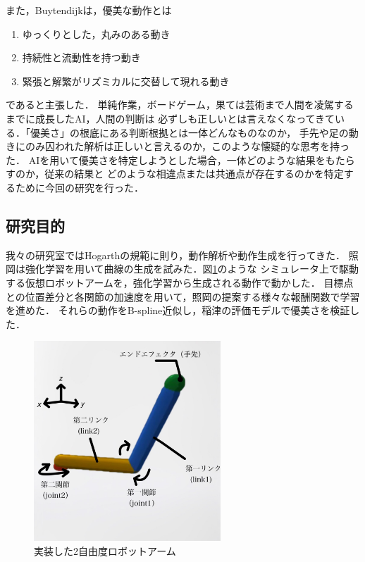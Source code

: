\clearpage

また，Buytendijkは，優美な動作とは
\begin{enumerate}
  \item ゆっくりとした，丸みのある動き
  \item 持続性と流動性を持つ動き
  \item 緊張と解繁がリズミカルに交替して現れる動き
\end{enumerate}
であると主張した．
単純作業，ボードゲーム，果ては芸術まで人間を凌駕するまでに成長したAI，人間の判断は
必ずしも正しいとは言えなくなってきている．「優美さ」の根底にある判断根拠とは一体どんなものなのか，
手先や足の動きにのみ囚われた解析は正しいと言えるのか，このような懐疑的な思考を持った．
AIを用いて優美さを特定しようとした場合，一体どのような結果をもたらすのか，従来の結果と
どのような相違点または共通点が存在するのかを特定するために今回の研究を行った．

\subsection{研究目的}
我々の研究室ではHogarthの規範に則り，動作解析や動作生成を行ってきた．
照岡\cite{teruoka}は強化学習を用いて曲線の生成を試みた．図\ref{robot_arm}のような
シミュレータ上で駆動する仮想ロボットアームを，強化学習から生成される動作で動かした．
目標点との位置差分と各関節の加速度を用いて，照岡の提案する様々な報酬関数で学習を進めた．
それらの動作をB-spline近似\cite{bspline}し，稲津\cite{inadu}の評価モデルで優美さを検証した．

\begin{figure}[b]
  \begin{center}
    \includegraphics[width=70mm]{images/robot_arm.png}
  \end{center}
  \caption{実装した2自由度ロボットアーム}
  \label{robot_arm}
\end{figure}

